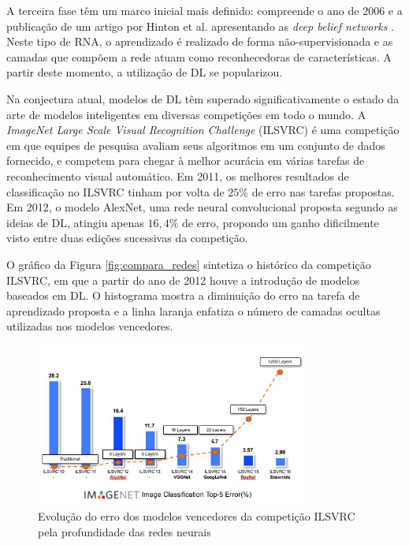 A terceira fase têm um marco inicial mais definido: compreende o ano de $2006$ e a publicação de um artigo por Hinton et al. apresentando as \emph{deep belief networks} \cite{hinton2006fast}. Neste tipo de RNA, o aprendizado é realizado de forma não-supervisionada e as camadas que compõem a rede atuam como reconhecedoras de características. A partir deste momento, a utilização de DL se popularizou.

Na conjectura atual, modelos de DL têm superado significativamente o estado da arte de modelos inteligentes em diversas competições em todo o mundo. A \emph{ImageNet Large Scale Visual Recognition Challenge} (ILSVRC) é uma competição em que equipes de pesquisa avaliam seus algoritmos em um conjunto de dados fornecido, e competem para chegar à melhor acurácia em várias tarefas de reconhecimento visual automático. Em 2011, os melhores resultados de  classificação no ILSVRC tinham por volta de $25\%$ de erro nas tarefas propostas. Em 2012, o modelo AlexNet, uma rede neural convolucional proposta segundo as ideias de DL, atingiu apenas $16,4\%$ de erro, propondo um ganho dificilmente visto entre duas edições sucessivas da competição.

O gráfico da Figura \ref{fig:compara_redes} sintetiza o histórico da competição ILSVRC, em que a partir do ano de 2012 houve a introdução de modelos baseados em DL. O histograma mostra a diminuição do erro na tarefa de aprendizado proposta e a linha laranja enfatiza o número de camadas ocultas utilizadas nos modelos vencedores.

\begin{figure}[!h]
	\centering
	\caption{Evolução do erro dos modelos vencedores da competição ILSVRC pela profundidade das redes neurais \cite{dl_ILSVRC}}
	\label{fig:compara_redes_ilsvrc}
	\includegraphics[width=0.8\textwidth]{img/compara_redes_ilsvrc.png}
\end{figure}


